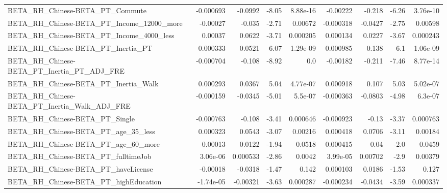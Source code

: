 \begin{tabular}{lrrrrrrrr}
BETA\_RH\_Chinese-BETA\_PT\_Commute                    &   -0.000693 &      -0.0992 &    -8.05 & 8.88e-16 &   -0.00222 &      -0.218 &        -6.26 &      3.76e-10 \\
BETA\_RH\_Chinese-BETA\_PT\_Income\_12000\_more          &    -0.00027 &       -0.035 &    -2.71 &  0.00672 &  -0.000318 &     -0.0427 &        -2.75 &       0.00598 \\
BETA\_RH\_Chinese-BETA\_PT\_Income\_4000\_less           &     0.00037 &       0.0622 &    -3.71 & 0.000205 &   0.000134 &      0.0227 &        -3.67 &      0.000243 \\
BETA\_RH\_Chinese-BETA\_PT\_Inertia\_PT                 &    0.000333 &       0.0521 &     6.07 & 1.29e-09 &   0.000985 &       0.138 &          6.1 &      1.06e-09 \\
BETA\_RH\_Chinese-BETA\_PT\_Inertia\_PT\_ADJ\_FRE         &   -0.000704 &       -0.108 &    -8.92 &      0.0 &   -0.00182 &      -0.211 &        -7.46 &      8.77e-14 \\
BETA\_RH\_Chinese-BETA\_PT\_Inertia\_Walk               &    0.000293 &       0.0367 &     5.04 & 4.77e-07 &   0.000918 &       0.107 &         5.03 &      5.02e-07 \\
BETA\_RH\_Chinese-BETA\_PT\_Inertia\_Walk\_ADJ\_FRE       &   -0.000159 &      -0.0345 &    -5.01 &  5.5e-07 &  -0.000363 &     -0.0803 &        -4.98 &       6.3e-07 \\
BETA\_RH\_Chinese-BETA\_PT\_Single                     &   -0.000763 &       -0.108 &    -3.41 & 0.000646 &  -0.000923 &       -0.13 &        -3.37 &      0.000763 \\
BETA\_RH\_Chinese-BETA\_PT\_age\_35\_less                &    0.000323 &       0.0543 &    -3.07 &  0.00216 &   0.000418 &      0.0706 &        -3.11 &       0.00184 \\
BETA\_RH\_Chinese-BETA\_PT\_age\_60\_more                &     0.00013 &       0.0122 &    -1.94 &   0.0518 &   0.000415 &        0.04 &         -2.0 &        0.0459 \\
BETA\_RH\_Chinese-BETA\_PT\_fulltimeJob                &    3.06e-06 &     0.000533 &    -2.86 &   0.0042 &   3.99e-05 &     0.00702 &         -2.9 &       0.00379 \\
BETA\_RH\_Chinese-BETA\_PT\_haveLicense                &    -0.00018 &      -0.0318 &    -1.47 &    0.142 &   0.000103 &      0.0186 &        -1.53 &         0.127 \\
BETA\_RH\_Chinese-BETA\_PT\_highEducation              &   -1.74e-05 &     -0.00321 &    -3.63 & 0.000287 &  -0.000234 &     -0.0434 &        -3.59 &      0.000337 \\

\end{tabular}
